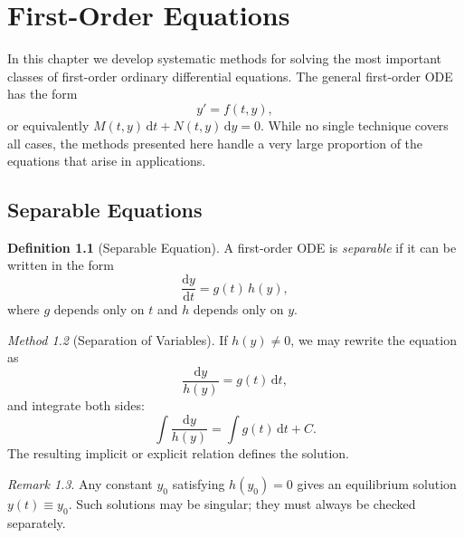 \documentclass[12pt,a4paper,openany]{book}
\theoremstyle{definition}
\newtheorem{definition}{Definition}[chapter]
\theoremstyle{plain}
\theoremstyle{remark}
\newtheorem{remark}[definition]{Remark}
\newtheorem{method}[definition]{Method}
\newcommand{\dd}{\mathrm{d}}
\begin{document}
\chapter{First-Order Equations}
\label{ch:first-order}

In this chapter we develop systematic methods for solving the most important classes of first-order ordinary differential equations. The general first-order ODE has the form
\begin{equation}\label{eq:first-order-general}
  y' = f(t,y),
\end{equation}
or equivalently $M(t,y)\,\dd t + N(t,y)\,\dd y = 0$. While no single technique covers all cases, the methods presented here handle a very large proportion of the equations that arise in applications.

\section{Separable Equations}
\label{sec:separable}

\begin{definition}[Separable Equation]
\label{def:separable}
A first-order ODE is \emph{separable} if it can be written in the form
\begin{equation}\label{eq:separable}
  \frac{\dd y}{\dd t} = g(t)\,h(y),
\end{equation}
where $g$ depends only on $t$ and $h$ depends only on $y$.
\end{definition}

\begin{method}[Separation of Variables]
\label{meth:separation}
If $h(y)\ne 0$, we may rewrite the equation as
\[
  \frac{\dd y}{h(y)} = g(t)\,\dd t,
\]
and integrate both sides:
\[
  \int \frac{\dd y}{h(y)} = \int g(t)\,\dd t + C.
\]
The resulting implicit or explicit relation defines the solution.
\end{method}

\begin{remark}
\label{rem:separable-singular}
Any constant $y_0$ satisfying $h(y_0)=0$ gives an equilibrium solution $y(t)\equiv y_0$. Such solutions may be singular; they must always be checked separately.
\end{remark}
\end{document}
